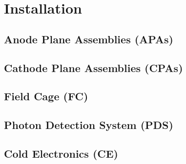 
\section{Installation}


\subsection{Anode Plane Assemblies (APAs)}



\subsection{Cathode Plane Assemblies (CPAs)}



\subsection{Field Cage (FC)}




\subsection{Photon Detection System (PDS)}



\subsection{Cold Electronics (CE)}